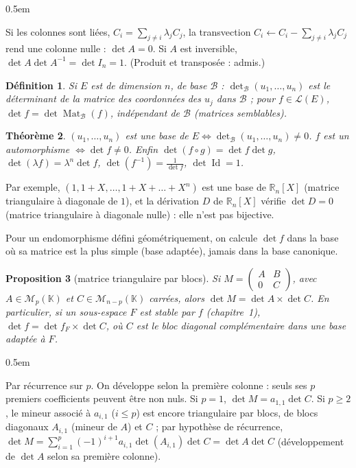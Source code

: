 \documentclass[a4paper,11pt]{article}
\makeatletter
\numberwithin{equation}{section}
\numberwithin{figure}{section}
\numberwithin{table}{section}
\theoremstyle{enonce}
\newtheorem{definition}{Définition}[section]
\newtheorem{theoreme}[definition]{Théorème}
\newtheorem{proposition}[definition]{Proposition}
\theoremstyle{exemple}
\theoremstyle{remarque}
\renewcommand{\proofname}{Démonstration}
\renewenvironment{proof}[1][\proofname]{\par\pushQED{\qed}\normalfont
  \topsep0.5em\relax\trivlist\item[\hskip\labelsep\sffamily\itshape\color{Gris}#1.]\ignorespaces}
  {\popQED\endtrivlist\@endpefalse}
\newcommand{\K}{\mathbb{K}}
\newcommand{\R}{\mathbb{R}}
\newcommand{\LE}{\mathcal{L}(E)}
\newcommand{\Mat}{\operatorname{Mat}}
\newcommand{\Id}{\operatorname{Id}}
\makeatother
\begin{document}
\begin{proof}
Si les colonnes sont liées, $C_i=\sum_{j\neq i}\lambda_jC_j$, la transvection $C_i\leftarrow C_i-\sum_{j\neq i}\lambda_jC_j$ rend
une colonne nulle : $\det A=0$. Si $A$ est inversible, $\det A\det A^{-1}=\det I_n=1$. (Produit et transposée : admis.)
\end{proof}

\begin{definition}
Si $E$ est de dimension $n$, de base $\mathcal B$ : $\det_{\mathcal B}(u_1,\dots,u_n)$ est le déterminant de la matrice des
coordonnées des $u_j$ dans $\mathcal B$ ; pour $f\in\LE$, $\det f=\det\Mat_{\mathcal B}(f)$, indépendant de $\mathcal B$
(matrices semblables).
\end{definition}

\begin{theoreme}\label{thm:base}
$(u_1,\dots,u_n)$ est une base de $E\iff\det_{\mathcal B}(u_1,\dots,u_n)\neq0$. $f$ est un automorphisme $\iff\det f\neq0$.
Enfin $\det(f\circ g)=\det f\det g$, $\det(\lambda f)=\lambda^n\det f$, $\det(f^{-1})=\frac1{\det f}$, $\det\Id=1$.
\end{theoreme}

Par exemple, $(1,1+X,\dots,1+X+\dots+X^n)$ est une base de $\R_n[X]$ (matrice triangulaire à diagonale de $1$), et la
dérivation $D$ de $\R_n[X]$ vérifie $\det D=0$ (matrice triangulaire à diagonale nulle) : elle n'est pas bijective.

\begin{reflexe}
Pour un endomorphisme défini géométriquement, on calcule $\det f$ dans la base où sa matrice est la plus simple (base
adaptée), jamais dans la base canonique.
\end{reflexe}

\begin{proposition}[matrice triangulaire par blocs]\label{prop:blocs}
Si $M=\begin{pmatrix}A&B\\0&C\end{pmatrix}$, avec $A\in\mathcal M_p(\K)$ et $C\in\mathcal M_{n-p}(\K)$ carrées, alors
$\det M=\det A\times\det C$. En particulier, si un sous-espace $F$ est stable par $f$ (chapitre~1), $\det f=\det f_F\times\det C$,
où $C$ est le bloc diagonal complémentaire dans une base adaptée à $F$.
\end{proposition}

\begin{proof}
Par récurrence sur $p$. On développe selon la première colonne : seuls ses $p$ premiers coefficients peuvent être non nuls. Si
$p=1$, $\det M=a_{1,1}\det C$. Si $p\geq2$, le mineur associé à $a_{i,1}$ ($i\leq p$) est encore triangulaire par blocs, de blocs
diagonaux $A_{i,1}$ (mineur de $A$) et $C$ ; par hypothèse de récurrence,
$\det M=\sum_{i=1}^p(-1)^{i+1}a_{i,1}\det(A_{i,1})\det C=\det A\det C$ (développement de $\det A$ selon sa première colonne).
\end{proof}
\end{document}
